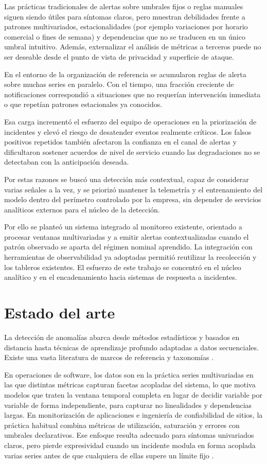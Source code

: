 Las prácticas tradicionales de alertas sobre umbrales fijos o reglas manuales siguen siendo útiles para síntomas claros, pero muestran debilidades frente a patrones multivariados, estacionalidades (por ejemplo variaciones por horario comercial o fines de semana) y dependencias que no se traducen en un único umbral intuitivo. Además, externalizar el análisis de métricas a terceros puede no ser deseable desde el punto de vista de privacidad y superficie de ataque.

En el entorno de la organización de referencia se acumularon reglas de alerta sobre muchas series en paralelo. Con el tiempo, una fracción creciente de notificaciones correspondió a situaciones que no requerían intervención inmediata o que repetían patrones estacionales ya conocidos. 

Esa carga incrementó el esfuerzo del equipo de operaciones en la priorización de incidentes y elevó el riesgo de desatender eventos realmente críticos. Los falsos positivos repetidos también afectaron la confianza en el canal de alertas y dificultaron sostener acuerdos de nivel de servicio cuando las degradaciones no se detectaban con la anticipación deseada. 

Por estas razones se buscó una detección más contextual, capaz de considerar varias señales a la vez, y se priorizó mantener la telemetría y el entrenamiento del modelo dentro del perímetro controlado por la empresa, sin depender de servicios analíticos externos para el núcleo de la detección.

Por ello se planteó un sistema integrado al monitoreo existente, orientado a procesar ventanas multivariadas y a emitir alertas contextualizadas cuando el patrón observado se aparta del régimen nominal aprendido. La integración con herramientas de observabilidad ya adoptadas permitió reutilizar la recolección y los tableros existentes. El esfuerzo de este trabajo se concentró en el núcleo analítico y en el encadenamiento hacia sistemas de respuesta a incidentes.

\section{Estado del arte}

La detección de anomalías abarca desde métodos estadísticos y basados en distancia hasta técnicas de aprendizaje profundo adaptadas a datos secuenciales. Existe una vasta literatura de marcos de referencia y taxonomías \citep{chandola2009anomaly}.

En operaciones de software, los datos son en la práctica series multivariadas en las que distintas métricas capturan facetas acopladas del sistema, lo que motiva modelos que traten la ventana temporal completa en lugar de decidir variable por variable de forma independiente, para capturar no linealidades y dependencias largas. En monitorización de aplicaciones e ingeniería de confiabilidad de sitios, la práctica habitual combina métricas de utilización, saturación y errores con umbrales declarativos. Ese enfoque resulta adecuado para síntomas univariados claros, pero pierde expresividad cuando un incidente modula en forma acoplada varias series antes de que cualquiera de ellas supere un límite fijo \citep{brazil2018prometheus}.

